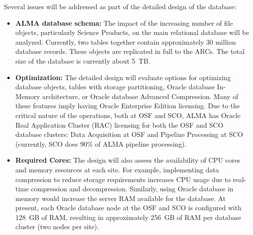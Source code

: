 Several issues will be addressed as part of the detailed design of the database:  
\begin{itemize}[itemsep=-0.5em]
    \item \textbf{ALMA database schema:} The impact of the increasing number of file objects, particularly Science Products, on the main relational database will be analyzed. Currently, two tables together contain approximately 30 million database records. These objects are replicated in full to the \acp{ARC}.  The total size of the database is currently about 5~TB.

    \item \textbf{Optimization:} The detailed design will evaluate options for optimizing database objects, tables with storage partitioning, Oracle database In-Memory architecture, or Oracle database Advanced Compression. Many of these features imply having Oracle Enterprise Edition licensing. Due to the critical nature of the operations, both at OSF and SCO, ALMA has Oracle Real Application Cluster (RAC) licensing for both the OSF and SCO database clusters: Data Acquisition at OSF and Pipeline Processing at SCO (currently, SCO does 90\% of ALMA pipeline processing).

    \item \textbf{Required Cores:} The design will also assess the availability of CPU cores and memory resources at each site. For example, implementing data compression to reduce storage requirements increases CPU usage due to real-time compression and decompression. Similarly, using Oracle database in memory would increase the server RAM available for the database. At present, each Oracle database node at the \ac{OSF} and \ac{SCO} is configured with 128~GB of RAM, resulting in approximately 256~GB of RAM per database cluster (two nodes per site).
\end{itemize}




